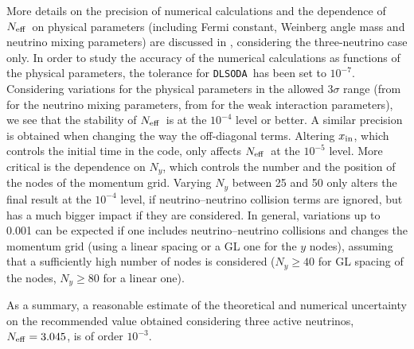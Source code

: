 \documentclass[notitlepage,showpacs,preprintnumbers,amsmath,amssymb,superscriptaddress,prd,onecolumn]{revtex4-1}
\newcommand{\Neff}{\ensuremath{N_{\rm eff}}}
\newcommand{\dlsoda}{\texttt{DLSODA}}
\begin{document}
More details on the precision of numerical calculations and the dependence of \Neff\ on physical parameters
(including Fermi constant, Weinberg angle mass and neutrino mixing parameters)
are discussed in \cite{Bennett:inprep}, considering the three-neutrino case only.
In order to study the accuracy of the numerical calculations as functions of the physical parameters,
the tolerance for \dlsoda\ has been set to $10^{-7}$.
Considering variations for the physical parameters in the allowed $3\sigma$ range
(from \cite{deSalas:2017kay} for the neutrino mixing parameters,
from \cite{Tanabashi:2018oca} for the weak interaction parameters),
we see that the stability of \Neff\ is at the $10^{-4}$ level or better.
A similar precision is obtained when changing the way the off-diagonal terms.
Altering $x_{\rm in}$, which controls the initial time in the code,
only affects \Neff\ at the $10^{-5}$ level.
More critical is the dependence on $N_y$,
which controls the number and the position of the nodes of the momentum grid.
Varying $N_y$ between 25 and 50 only alters the final result at the $10^{-4}$ level,
if neutrino--neutrino collision terms are ignored,
but has a much bigger impact if they are considered.
In general, variations up to 0.001 can be expected
if one includes neutrino--neutrino collisions and changes the momentum grid
(using a linear spacing or a GL one for the $y$ nodes),
assuming that a sufficiently high number of nodes is considered
($N_y\geq40$ for GL spacing of the nodes, $N_y\geq80$ for a linear one).

As a summary, a reasonable estimate of the theoretical and numerical uncertainty on the recommended value
obtained considering three active neutrinos,
$\Neff=3.045$,
is of order $10^{-3}$.
\end{document}

